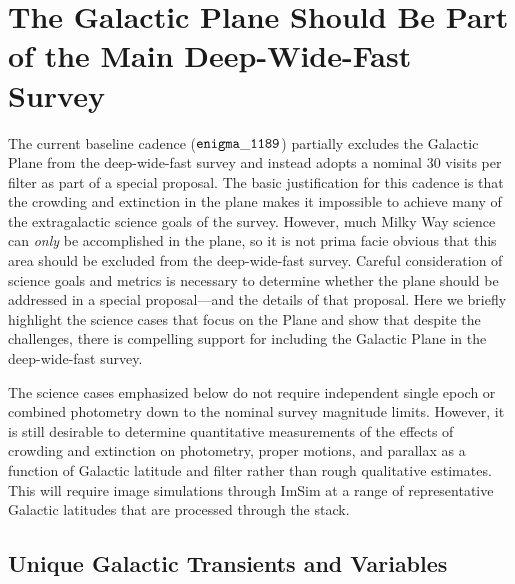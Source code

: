 %
%
%    
% 
%
%

\section{The Galactic Plane Should Be Part of the Main Deep-Wide-Fast Survey}
\def\secname{MW_Plane}\label{sec:\secname} %



The current baseline cadence (${\tt enigma\_1189}$) partially excludes the Galactic Plane from the deep-wide-fast survey and instead adopts a nominal 30 visits 
per filter as part of a special proposal. The basic justification for this cadence is that the crowding and extinction in the plane makes it impossible to 
achieve many of the extragalactic science goals of the survey. However, much Milky Way science can \emph{only} be accomplished in the plane, so it is not 
prima facie obvious that this area should be excluded from the deep-wide-fast survey. Careful consideration of science goals and metrics is necessary to 
determine whether the plane should be addressed in a special proposal---and the details of that proposal. Here we briefly highlight the science cases that 
focus on the Plane and show that despite the challenges, there is compelling support for including the Galactic Plane in the deep-wide-fast survey.

The science cases emphasized below do not require independent single epoch or combined photometry down to the nominal survey magnitude limits. However, it is 
still desirable to determine quantitative measurements of the effects of crowding and extinction on photometry, proper motions, and parallax as a function of 
Galactic latitude and filter rather than rough qualitative estimates. This will require image simulations through ImSim at a range of representative Galactic 
latitudes that are processed through the stack.

\subsection{Unique Galactic Transients and Variables}


